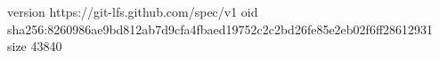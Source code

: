 version https://git-lfs.github.com/spec/v1
oid sha256:8260986ae9bd812ab7d9cfa4fbaed19752c2c2bd26fe85e2eb02f6ff28612931
size 43840
